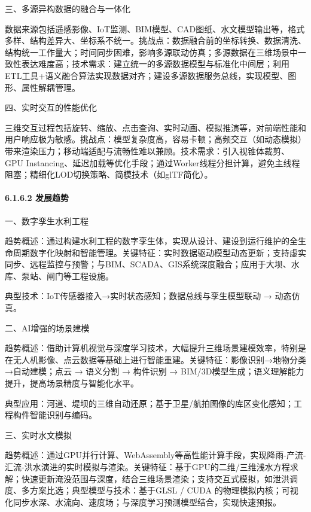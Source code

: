 三、多源异构数据的融合与一体化

数据来源包括遥感影像、IoT监测、BIM模型、CAD图纸、水文模型输出等，格式多样、结构差异大、坐标系不统一。挑战点：数据融合前的坐标转换、数据清洗、结构统一工作量大；时间同步困难，影响多源联动仿真；多源数据在三维场景中一致性表达难度高；技术需求：建立统一的多源数据模型与标准化中间层；利用ETL工具+语义融合算法实现数据对齐；建设多源数据服务总线，实现模型、图形、属性解耦管理。

四、实时交互的性能优化

三维交互过程包括旋转、缩放、点击查询、实时动画、模拟推演等，对前端性能和用户响应极为敏感。挑战点：模型复杂度高，容易卡顿；高频交互（如动态模拟）带来渲染压力；移动端适配与流畅性难以兼顾。技术需求：引入视锥体裁剪、GPU Instancing、延迟加载等优化手段；通过Worker线程分担计算，避免主线程阻塞；精细化LOD切换策略、简模技术（如glTF简化）。

\hypertarget{ux53d1ux5c55ux8d8bux52bf-1}{%
\paragraph{6.1.6.2 发展趋势}\label{ux53d1ux5c55ux8d8bux52bf-1}}

一、数字孪生水利工程

趋势概述：通过构建水利工程的数字孪生体，实现从设计、建设到运行维护的全生命周期数字化映射和智能管理。关键特征：实时数据驱动模型动态更新；支持虚实同步、远程监控与预警；与BIM、SCADA、GIS系统深度融合；应用于大坝、水库、泵站、闸门等工程设施。

典型技术：IoT传感器接入→实时状态感知；数据总线与孪生模型联动 → 动态仿真。

二、AI增强的场景建模

趋势概述：借助计算机视觉与深度学习技术，大幅提升三维场景建模效率，特别是在无人机影像、点云数据等基础上进行智能重建。关键特征：影像识别→地物分类→自动建模；点云 → 语义分割 → 构件识别 → BIM/3D模型生成；语义理解能力提升，提高场景精度与智能化水平。

典型应用：河道、堤坝的三维自动还原；基于卫星/航拍图像的库区变化感知；工程构件智能识别与编码。

三、实时水文模拟

趋势概述：通过GPU并行计算、WebAssembly等高性能计算手段，实现降雨-产流-汇流-洪水演进的实时模拟与渲染。关键特征：基于GPU的二维/三维浅水方程求解；快速更新淹没范围与深度，结合三维场景渲染；支持交互式模拟，如泄洪调度、多方案比选；典型模型与技术：基于GLSL / CUDA 的物理模拟内核；可视化同步水深、水流向、速度场；与深度学习预测模型结合，实现快速预报。

